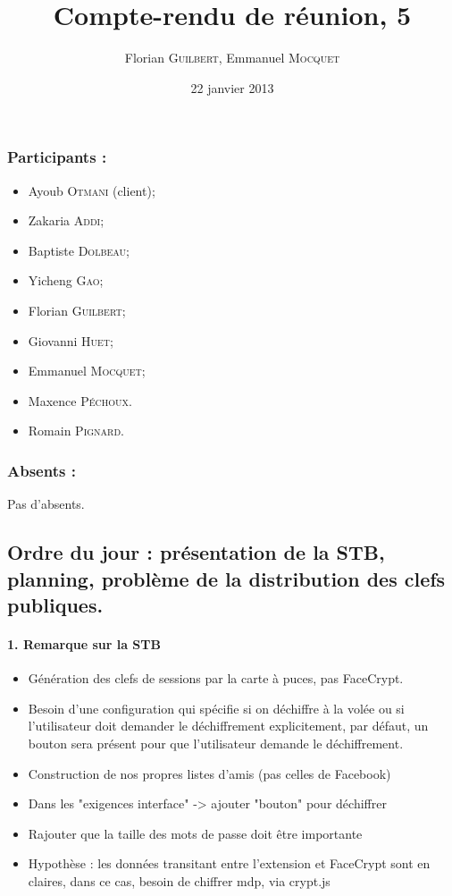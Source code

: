 \documentclass[a4paper,10pt]{article}
\author{Florian \textsc{Guilbert}, Emmanuel \textsc{Mocquet}}
\title{Compte-rendu de réunion, 5}
\date{22 janvier 2013}
\begin{document}
\maketitle

\subsubsection*{Participants : }
\begin{itemize}
    \item Ayoub \textsc{Otmani} (client);
    \item Zakaria \textsc{Addi};
    \item Baptiste \textsc{Dolbeau};
    \item Yicheng \textsc{Gao};
    \item Florian \textsc{Guilbert};
    \item Giovanni \textsc{Huet};
    \item Emmanuel \textsc{Mocquet};
    \item Maxence  \textsc{Péchoux}.
    \item Romain \textsc{Pignard}.
\end{itemize}

\subsubsection*{Absents : }
Pas d'absents.

\subsection*{Ordre du jour : présentation de la STB, planning, problème de la 
    distribution des clefs publiques.}


\paragraph{1. Remarque sur la STB}

\begin{itemize}
\item Génération des clefs de sessions par la carte à puces, pas FaceCrypt.
\item Besoin d'une configuration qui spécifie si on déchiffre à la volée ou si 
l'utilisateur doit demander le déchiffrement explicitement, par défaut,
un bouton sera présent pour que l'utilisateur demande le déchiffrement.
\item Construction de nos propres listes d'amis (pas celles de Facebook)
\item Dans les "exigences interface" -> ajouter "bouton" pour déchiffrer
\item Rajouter que la taille des mots de passe doit être importante
\item Hypothèse : les données transitant entre l'extension et FaceCrypt sont en 
claires, dans ce cas, besoin de chiffrer mdp, via crypt.js
\end{itemize}
\end{document}
